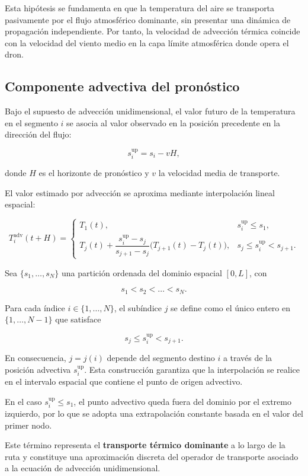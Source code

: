 \documentclass[
  spanish,
  us-letterpaper,
]{scrreprt}
\numberwithin{equation}{section}
\begin{document}
Esta hipótesis se fundamenta en que la temperatura del aire se
transporta pasivamente por el flujo atmosférico dominante, sin presentar
una dinámica de propagación independiente. Por tanto, la velocidad de
advección térmica coincide con la velocidad del viento medio en la capa
límite atmosférica donde opera el dron.

\subsection{Componente advectiva del
pronóstico}\label{componente-advectiva-del-pronuxf3stico}

Bajo el supuesto de advección unidimensional, el valor futuro de la
temperatura en el segmento \(i\) se asocia al valor observado en la
posición precedente en la dirección del flujo:

\[
s_i^{\text{up}} = s_i - vH,
\]

donde \(H\) es el horizonte de pronóstico y \(v\) la velocidad media de
transporte.

El valor estimado por advección se aproxima mediante interpolación
lineal espacial:

\[
T_i^{\text{adv}}(t+H) =
\begin{cases}
T_1(t), & s_i^{\text{up}} \le s_1, \\[6pt]
T_j(t) + \dfrac{s_i^{\text{up}} - s_j}{s_{j+1}-s_j}\bigl(T_{j+1}(t)-T_j(t)\bigr), & s_j \le s_i^{\text{up}} < s_{j+1}.
\end{cases}
\]

Sea \(\{s_1,\dots,s_N\}\) una partición ordenada del dominio espacial
\([0,L]\), con

\[
s_1 < s_2 < \dots < s_N.
\]

Para cada índice \(i \in \{1,\dots,N\}\), el subíndice \(j\) se define
como el único entero en \(\{1,\dots,N-1\}\) que satisface

\[
s_j \le s_i^{\text{up}} < s_{j+1}.
\]

En consecuencia, \(j = j(i)\) depende del segmento destino \(i\) a
través de la posición advectiva \(s_i^{\text{up}}\). Esta construcción
garantiza que la interpolación se realice en el intervalo espacial que
contiene el punto de origen advectivo.

En el caso \(s_i^{\text{up}} \le s_1\), el punto advectivo queda fuera
del dominio por el extremo izquierdo, por lo que se adopta una
extrapolación constante basada en el valor del primer nodo.

Este término representa el \textbf{transporte térmico dominante} a lo
largo de la ruta y constituye una aproximación discreta del operador de
transporte asociado a la ecuación de advección unidimensional.
\end{document}

